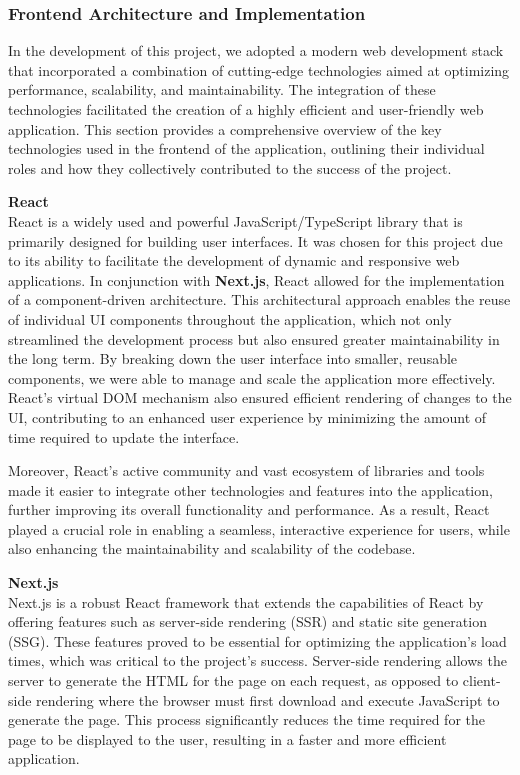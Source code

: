\subsubsection{Frontend Architecture and Implementation}
In the development of this project, we adopted a modern web development stack
that incorporated a combination of cutting{-}edge technologies aimed at
optimizing performance, scalability, and maintainability. The integration of
these technologies facilitated the creation of a highly efficient and
user{-}friendly web application. This section provides a comprehensive overview
of the key technologies used in the frontend of the application, outlining their
individual roles and how they collectively contributed to the success of the
project.

\vspace{0.5cm}

\textbf{React} \\
React is a widely used and powerful JavaScript/TypeScript library that is
primarily designed for building user interfaces. It was chosen for this
project due to its ability to facilitate the development of dynamic and
responsive web applications. In conjunction with \textbf{Next.js}, React
allowed for the implementation of a component{-}driven architecture. This
architectural approach enables the reuse of individual UI components
throughout the application, which not only streamlined the development
process but also ensured greater maintainability in the long term. By
breaking down the user interface into smaller, reusable components, we were
able to manage and scale the application more effectively. React's virtual
DOM mechanism also ensured efficient rendering of changes to the UI,
contributing to an enhanced user experience by minimizing the amount of
time required to update the interface.

Moreover, React's active community and vast ecosystem of libraries and tools
made it easier to integrate other technologies and features into the
application, further improving its overall functionality and performance. As
a result, React played a crucial role in enabling a seamless, interactive
experience for users, while also enhancing the maintainability and
scalability of the codebase.

\vspace{0.5cm}

\textbf{Next.js} \\
Next.js is a robust React framework that extends the capabilities of React
by offering features such as server{-}side rendering (SSR) and static site
generation (SSG). These features proved to be essential for optimizing the
application's load times, which was critical to the project's success.
Server{-}side rendering allows the server to generate the HTML for the page
on each request, as opposed to client{-}side rendering where the browser
must first download and execute JavaScript to generate the page. This
process significantly reduces the time required for the page to be displayed
to the user, resulting in a faster and more efficient application.

